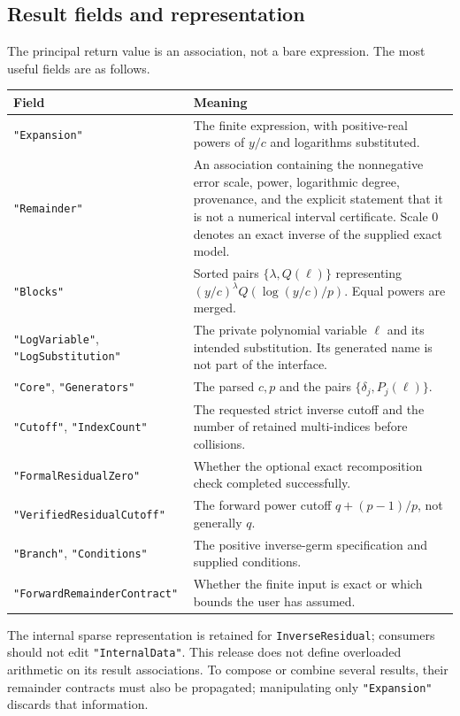 \documentclass[11pt,a4paper]{article}
\numberwithin{equation}{section}
\theoremstyle{definition}
\newcommand{\code}[1]{\texttt{#1}}
\begin{document}
\subsection{Result fields and representation}
The principal return value is an association, not a bare expression.
The most useful fields are as follows.
\begingroup\small
\begin{longtable}{@{}>{\raggedright\arraybackslash}p{}>{\raggedright\arraybackslash}p{}@{}}
\toprule
Field & Meaning\\\midrule\endhead
\code{"Expansion"} & The finite expression, with positive-real powers of
$y/c$ and logarithms substituted.\\[4pt]
\code{"Remainder"} & An association containing the nonnegative error scale,
power, logarithmic degree, provenance, and the explicit statement that it
is not a numerical interval certificate. Scale $0$ denotes an exact
inverse of the supplied exact model.\\[4pt]
\code{"Blocks"} & Sorted pairs $\{\lambda,Q(\ell)\}$ representing
$(y/c)^\lambda Q(\log(y/c)/p)$. Equal powers are merged.\\[4pt]
\code{"LogVariable"}, \code{"LogSubstitution"} & The private polynomial
variable $\ell$ and its intended substitution. Its generated name is not
part of the interface.\\[4pt]
\code{"Core"}, \code{"Generators"} & The parsed $c,p$ and the pairs
$\{\delta_j,P_j(\ell)\}$.\\[4pt]
\code{"Cutoff"}, \code{"IndexCount"} & The requested strict inverse cutoff
and the number of retained multi-indices before collisions.\\[4pt]
\code{"FormalResidualZero"} & Whether the optional exact recomposition
check completed successfully.\\[4pt]
\code{"VerifiedResidualCutoff"} & The forward power cutoff
$q+(p-1)/p$, not generally $q$.\\[4pt]
\code{"Branch"}, \code{"Conditions"} & The positive inverse-germ
specification and supplied conditions.\\[4pt]
\code{"ForwardRemainderContract"} & Whether the finite input is exact or
which bounds the user has assumed.\\
\bottomrule
\end{longtable}
\endgroup
The internal sparse representation is retained for
\code{InverseResidual}; consumers should not edit \code{"InternalData"}.
This release does not define overloaded arithmetic on its result
associations. To compose or combine several results, their remainder
contracts must also be propagated; manipulating only
\code{"Expansion"} discards that information.
\end{document}
